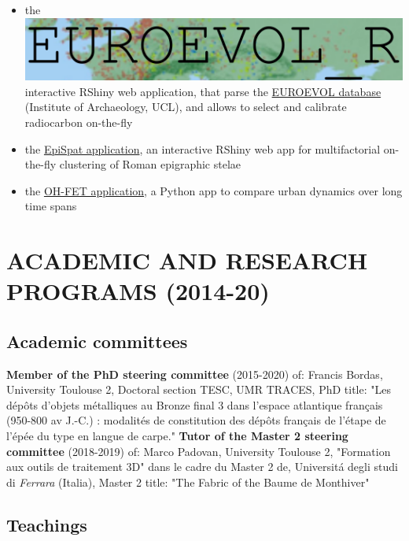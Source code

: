 \documentclass[11pt]{report} %
\begin{document}
\begin{itemize}
 \item the \href{https://neolithic.shinyapps.io/Euroevol\_R/}{\includegraphics[scale=0.25]{"euroevol_R"}} interactive RShiny web application, that parse the \href{http://discovery.ucl.ac.uk/1469811/}{EUROEVOL database} (Institute of Archaeology, UCL), and allows to select and calibrate radiocarbon on-the-fly
 \item the \href{https://epispat.shinyapps.io/analyses_mult_5/}{EpiSpat application}, an interactive RShiny web app for multifactorial on-the-fly clustering of Roman epigraphic stelae
  \item the \href{https://www.oxbowbooks.com/dbbc/caa2014-21st-century-archaeology.html/}{OH-FET application}, a Python app to compare urban dynamics over long time spans
\end{itemize}


\section*{ACADEMIC AND RESEARCH PROGRAMS (2014-20)}

\subsection*{Academic committees}

\textbf{Member of the PhD steering committee} (2015-2020) of: Francis Bordas, University Toulouse 2, Doctoral section TESC, UMR TRACES, PhD title: "Les d\'{e}p\^{o}ts d'objets m\'{e}talliques au Bronze final 3 dans l'espace atlantique fran\c{c}ais (950-800 av J.-C.) : modalit\'{e}s de constitution des d\'{e}p\^{o}ts fran\c{c}ais de l'\'{e}tape de l'\'{e}p\'{e}e du type en langue de carpe."
\smallbreak
\textbf{Tutor of the Master 2  steering committee} (2018-2019) of: Marco Padovan, University Toulouse 2, "Formation aux outils de traitement 3D" dans le cadre du Master 2 de, Universit\'{a} degli studi di \textit{Ferrara} (Italia), Master 2 title: "The Fabric of the Baume de Monthiver"

\subsection*{Teachings}
\end{document}
